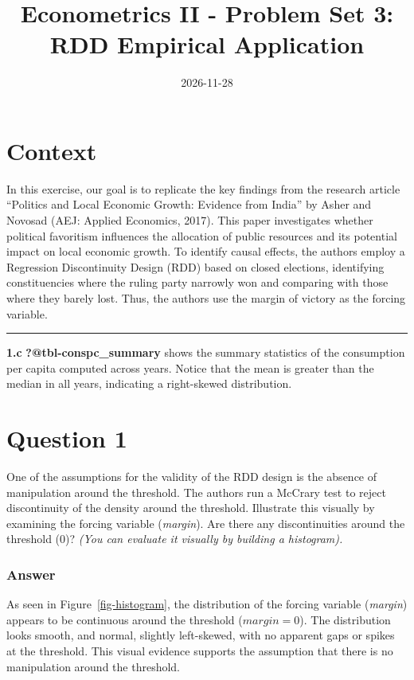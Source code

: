 \documentclass[
  letterpaper,
  DIV=11,
  numbers=noendperiod]{scrartcl}
\title{Econometrics II - Problem Set 3: RDD Empirical Application}
\author{}
\date{2026-11-28}
\begin{document}
\maketitle


\section{Context}\label{context}

In this exercise, our goal is to replicate the key findings from the
research article ``Politics and Local Economic Growth: Evidence from
India'' by Asher and Novosad (AEJ: Applied Economics, 2017). This paper
investigates whether political favoritism influences the allocation of
public resources and its potential impact on local economic growth. To
identify causal effects, the authors employ a Regression Discontinuity
Design (RDD) based on closed elections, identifying constituencies where
the ruling party narrowly won and comparing with those where they barely
lost. Thus, the authors use the margin of victory as the forcing
variable.

\begin{center}\rule{0.5\linewidth}{0.5pt}\end{center}

\textbf{1.c} \textbf{?@tbl-conspc\_summary} shows the summary statistics
of the consumption per capita computed across years. Notice that the
mean is greater than the median in all years, indicating a right-skewed
distribution.

\section{Question 1}\label{question-1}

One of the assumptions for the validity of the RDD design is the absence
of manipulation around the threshold. The authors run a McCrary test to
reject discontinuity of the density around the threshold. Illustrate
this visually by examining the forcing variable (\emph{margin}). Are
there any discontinuities around the threshold (0)? \emph{(You can
evaluate it visually by building a histogram).}

\subsubsection{Answer}\label{answer}

As seen in Figure~\ref{fig-histogram}, the distribution of the forcing
variable (\emph{margin}) appears to be continuous around the threshold
(\(margin = 0\)). The distribution looks smooth, and normal, slightly
left-skewed, with no apparent gaps or spikes at the threshold. This
visual evidence supports the assumption that there is no manipulation
around the threshold.
\end{document}
